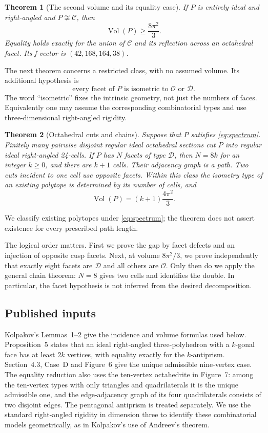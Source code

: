 \documentclass[11pt]{article}
\newtheorem{theorem}{Theorem}[section]
\theoremstyle{remark}
\newcommand{\Vol}{\operatorname{Vol}}
\newcommand{\OCT}{\mathcal O}
\newcommand{\DBL}{\mathcal D}
\newcommand{\CELL}{\mathcal C}
\begin{document}
\begin{theorem}[The second volume and its equality case]\label{thm:gap}
If $P$ is entirely ideal and right-angled and $P\not\cong\CELL$, then
\[
 \Vol(P)\ge\frac{8\pi^2}{3}.
\]
Equality holds exactly for the union of $\CELL$ and its reflection
across an octahedral facet. Its f-vector is $(42,168,164,38)$.
\end{theorem}

The next theorem concerns a restricted class, with no assumed volume.
Its additional hypothesis is
\begin{equation}\label{eq:spectrum}
 \text{every facet of $P$ is isometric to $\OCT$ or $\DBL$.}
\end{equation}
The word ``isometric'' fixes the intrinsic geometry, not just the
numbers of faces. Equivalently one may assume the corresponding
combinatorial types and use three-dimensional right-angled rigidity.

\begin{theorem}[Octahedral cuts and chains]\label{thm:chain}
Suppose that $P$ satisfies \eqref{eq:spectrum}. Finitely many pairwise
disjoint regular ideal octahedral sections cut $P$ into regular ideal
right-angled 24-cells. If $P$ has $N$ facets of type $\DBL$, then
$N=8k$ for an integer $k\ge0$, and there are $k+1$ cells. Their
adjacency graph is a path. Two cuts incident to one cell use opposite
facets. Within this class the isometry type of an existing polytope
is determined by its number of cells, and
\[
 \Vol(P)=(k+1)\frac{4\pi^2}{3}.
\]
\end{theorem}
We classify existing polytopes under \eqref{eq:spectrum}; the theorem
does not assert existence for every prescribed path length.

The logical order matters. First we prove the gap by facet defects
and an injection of opposite cusp facets. Next, at volume $8\pi^2/3$,
we prove independently that exactly eight facets are $\DBL$ and all
others are $\OCT$. Only then do we apply the general chain theorem:
$N=8$ gives two cells and identifies the double. In particular, the
facet hypothesis is not inferred from the desired decomposition.

\subsection{Published inputs}
Kolpakov's Lemmas~1--2 give the incidence and volume formulas used
below. Proposition~5 states that an ideal right-angled
three-polyhedron with a $k$-gonal face has at least $2k$ vertices,
with equality exactly for the $k$-antiprism. Section~4.3, Case~D and
Figure~6 give the unique admissible nine-vertex case. The equality
reduction also uses the ten-vertex octahedrite in Figure~7: among the
ten-vertex types with only triangles and quadrilaterals it is the
unique admissible one, and the edge-adjacency graph of its four
quadrilaterals consists of two disjoint edges. The pentagonal
antiprism is treated separately. We use the standard right-angled
rigidity in dimension three to identify these combinatorial models
geometrically, as in Kolpakov's use of Andreev's theorem.
\end{document}
